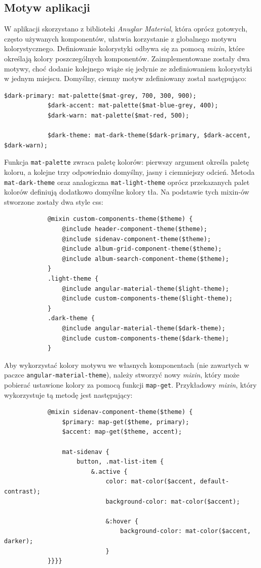 	\subsection{Motyw aplikacji}
		W aplikacji skorzystano z biblioteki \emph{Anuglar Material}, która oprócz gotowych, często używanych komponentów,
		ułatwia korzystanie z globalnego motywu kolorystycznego.
		Definiowanie kolorystyki odbywa się za pomocą \emph{mixin}, które określają kolory poszczególnych komponentów.
		Zaimplementowane zostały dwa motywy, choć dodanie kolejnego wiąże się jedynie ze zdefiniowaniem kolorystyki w jednym miejscu.
		Domyślny, ciemny motyw zdefiniowany został następująco:
		\begin{lstlisting}[label=lst:darkTheme]
			$dark-primary: mat-palette($mat-grey, 700, 300, 900);
			$dark-accent: mat-palette($mat-blue-grey, 400);
			$dark-warn: mat-palette($mat-red, 500);
			
			$dark-theme: mat-dark-theme($dark-primary, $dark-accent, $dark-warn);
		\end{lstlisting}
		Funkcja \verb|mat-palette| zwraca paletę kolorów: pierwszy argument określa paletę koloru, a kolejne trzy odpowiednio domyślny, jasny i ciemniejszy odcień.
		Metoda \verb|mat-dark-theme| oraz analogiczna \verb|mat-light-theme| oprócz przekazanych palet kolorów definiują dodatkowo domyślne kolory tła.
		Na podstawie tych mixin-ów stworzone zostały dwa style css:
		\begin{lstlisting}			
			@mixin custom-components-theme($theme) {
				@include header-component-theme($theme);
				@include sidenav-component-theme($theme);
				@include album-grid-component-theme($theme);
				@include album-search-component-theme($theme);
			}
			.light-theme {
				@include angular-material-theme($light-theme);
				@include custom-components-theme($light-theme);
			}
			.dark-theme {
				@include angular-material-theme($dark-theme);
				@include custom-components-theme($dark-theme);
			}	
		\end{lstlisting}

		Aby wykorzystać kolory motywu we własnych komponentach (nie zawartych w paczce \verb|angular-material-theme|),
		należy stworzyć nowy \emph{mixin}, który może pobierać ustawione kolory za pomocą funkcji \verb|map-get|.
		Przykładowy \emph{mixin}, który wykorzystuje tą metodę jest następujący:
		\begin{lstlisting}
			@mixin sidenav-component-theme($theme) {
				$primary: map-get($theme, primary);
				$accent: map-get($theme, accent);
			
				mat-sidenav {
					button, .mat-list-item {
						&.active {
							color: mat-color($accent, default-contrast);
							background-color: mat-color($accent);
			
							&:hover {
								background-color: mat-color($accent, darker);
							}
			}}}}
		\end{lstlisting}

